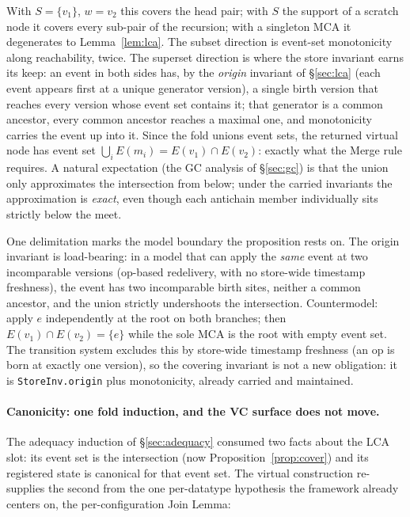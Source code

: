 \documentclass[11pt]{article}
\newcommand{\lean}[1]{\texttt{#1}}
\begin{document}
With $S = \{v_1\}$, $w = v_2$ this covers the head pair; with $S$ the
support of a scratch node it covers every sub-pair of the recursion;
with a singleton MCA it degenerates to Lemma~\ref{lem:lca}. The subset
direction is event-set monotonicity along reachability, twice. The
superset direction is where the store invariant earns its keep: an
event in both sides has, by the \emph{origin} invariant of
\S\ref{sec:lca} (each event appears first at a unique generator
version), a single birth version that reaches every version whose event
set contains it; that generator is a common ancestor, every common
ancestor reaches a maximal one, and monotonicity carries the event up
into it. Since the fold unions event sets, the returned virtual node
has event set $\bigcup_i E(m_i) = E(v_1) \cap E(v_2)$: exactly what the
Merge rule requires. A natural expectation (the GC analysis of
\S\ref{sec:gc}) is that the union only approximates the intersection
from below; under the carried invariants the approximation is
\emph{exact}, even though each antichain member individually sits
strictly below the meet.

One delimitation marks the model boundary the proposition rests on. The
origin invariant is load-bearing: in a
model that can apply the \emph{same} event at two incomparable versions
(op-based redelivery, with no store-wide timestamp freshness), the
event has two incomparable birth sites, neither a common ancestor, and
the union strictly undershoots the intersection. Countermodel: apply
$e$ independently at the root on both branches; then
$E(v_1) \cap E(v_2) = \{e\}$ while the sole MCA is the root with empty
event set. The transition system excludes this by store-wide timestamp
freshness (an op is born at exactly one version), so the covering
invariant is not a new obligation: it is \lean{StoreInv.origin} plus
monotonicity, already carried and maintained.

\paragraph{Canonicity: one fold induction, and the VC surface does not
move.} The adequacy induction of \S\ref{sec:adequacy} consumed two
facts about the LCA slot: its event set is the intersection (now
Proposition~\ref{prop:cover}) and its registered state is canonical for
that event set. The virtual construction re-supplies the second from
the one per-datatype hypothesis the framework already centers on, the
per-configuration Join Lemma:
\end{document}
